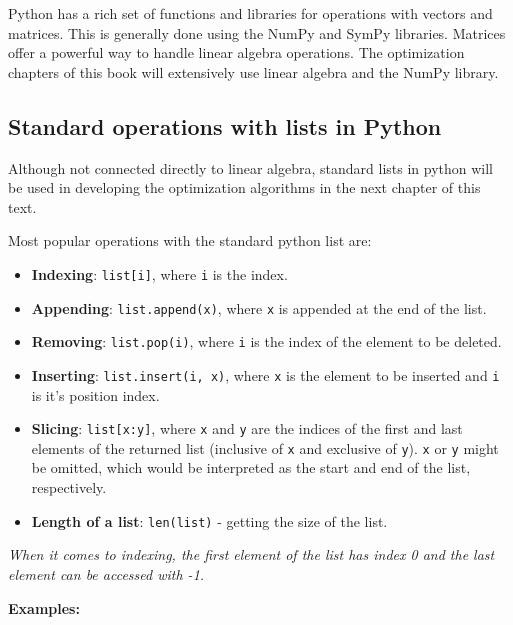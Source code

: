 \documentclass[11pt]{article}
\providecommand{\tightlist}{%
      \setlength{\itemsep}{0pt}\setlength{\parskip}{0pt}}
\begin{document}
Python has a rich set of functions and libraries for operations with
vectors and matrices. This is generally done using the NumPy and SymPy
libraries. Matrices offer a powerful way to handle linear algebra
operations. The optimization chapters of this book will extensively use
linear algebra and the NumPy library.

    \subsection{Standard operations with lists in
Python}\label{standard-operations-with-lists-in-python}

Although not connected directly to linear algebra, standard lists in
python will be used in developing the optimization algorithms in the
next chapter of this text.

Most popular operations with the standard python list are:

\begin{itemize}
\tightlist
\item
  \textbf{Indexing}: \texttt{list{[}i{]}}, where \texttt{i} is the
  index.
\item
  \textbf{Appending}: \texttt{list.append(x)}, where \texttt{x} is
  appended at the end of the list.
\item
  \textbf{Removing}: \texttt{list.pop(i)}, where \texttt{i} is the index
  of the element to be deleted.
\item
  \textbf{Inserting}: \texttt{list.insert(i,\ x)}, where \texttt{x} is
  the element to be inserted and \texttt{i} is it's position index.
\item
  \textbf{Slicing}: \texttt{list{[}x:y{]}}, where \texttt{x} and
  \texttt{y} are the indices of the first and last elements of the
  returned list (inclusive of \texttt{x} and exclusive of \texttt{y}).
  \texttt{x} or \texttt{y} might be omitted, which would be interpreted
  as the start and end of the list, respectively.
\item
  \textbf{Length of a list}: \texttt{len(list)} - getting the size of
  the list.
\end{itemize}

\emph{When it comes to indexing, the first element of the list has index
0 and the last element can be accessed with -1.}

\textbf{Examples:}
\end{document}
